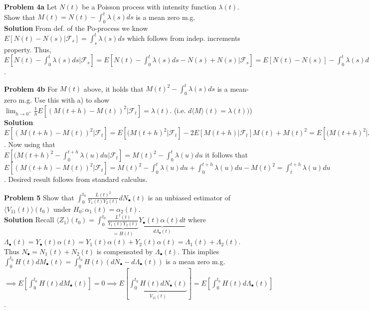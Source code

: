 \documentclass{article}
\begin{document}
\textbf{Problem 4a} Let $N(t)$ be a Poisson process with intensity function $\lambda(t)$. Show that $M(t) = N(t) - \int_0^t \lambda (s)ds$ is a mean zero m.g. \\
\textbf{Solution} From def. of the Po-process we know  $E[N(t)-N(s) | \mathcal{F}_s] = \int_s^t \lambda (s)ds$ which follows from indep. increments property. Thus, 
$E[N(t) - \int_0^t \lambda (s)ds |  \mathcal{F}_s] = E[N(t) - \int_0^t \lambda (s)ds - N(s) + N(s)|  \mathcal{F}_s] = E[N(t) -N(s)] - \int_0^t \lambda (s)ds + N(s) =  \int_s^t \lambda (s)ds - \int_0^t \lambda (s)ds + N(s) =  N(s)- \int_0^s \lambda (s)ds$.

\medskip

\textbf{Problem 4b} For $M(t)$ above, it holds that $M(t)^2 - \int_0^t \lambda (s)ds$ is a mean-zero m.g. Use this with a) to show $\lim_{h\to0^+} \frac{1}{h} E[(M(t+h)-M(t))^2|\mathcal{F}_t] = \lambda(t)$. (i.e. $ d \langle M  \rangle (t) = \lambda(t))$) \\
\textbf{Solution} $E[(M(t+h)-M(t))^2|\mathcal{F}_t] = E[(M(t+h)^2|\mathcal{F}_t]- 2E[M(t+h)|\mathcal{F}_t]M(t) + M(t)^2 = E[(M(t+h)^2|\mathcal{F}_t] - M(t)$. Now using that $E[(M(t+h)^2 - \int_0^{t+h} \lambda(u)du|\mathcal{F}_t] = M(t)^2 - \int_0^t \lambda (u)du$ it follows that $E[(M(t+h)-M(t))^2|\mathcal{F}_t] = M(t)^2 - \int_0^t \lambda (u)du + \int_0^{t+h} \lambda(u)du - M(t)^2 = \int_t^{t+h} \lambda(u)du$. Desired result follows from standard calculus. 


\textbf{Problem 5} Show that $\int_0^{t_0} \frac{L(t)^2}{Y_1(t)Y_2(t)} dN_{\bullet}(t)$ is an unbiased estimator of $\langle V_{11}(t) \rangle (t_0)$ under $H_0: \alpha_1(t) = \alpha_2(t)$. \\ 

\textbf{Solution} Recall $\langle Z_1 \rangle (t_0) = \int_0^{t_0} \underbrace{\frac{L^2(t)}{Y_1(t)Y_2(t)}}_{=H(t)} \underbrace{Y_{\bullet}(t)\alpha(t)dt}_{d\Lambda_{\bullet}(t)}$ where $\Lambda_{\bullet}(t) = Y_{\bullet}(t)\alpha(t) = Y_{1}(t)\alpha(t) + Y_{2}(t)\alpha(t) = \Lambda_{1}(t) + \Lambda_{2}(t)$. Thus $N_{\bullet} = N_{1}(t)+N_{2}(t)$ is compensated by $\Lambda_{\bullet}(t)$. This implies $\int_0^{t_0} H(t) dM_{\bullet} (t) = \int_0^{t_0} H(t) (dN_{\bullet}-d\Lambda_{\bullet}(t))$ is a mean zero m.g. $\implies E[\int_0^{t_0} H(t) dM_{\bullet} (t)] = 0 \implies E[\underbrace{\int_0^{t_0} H(t) dN_{\bullet} (t)}_{V_{11}(t)}] = E[\int_0^{t_0} H(t) d\Lambda_{\bullet} (t)]$.
\end{document}
